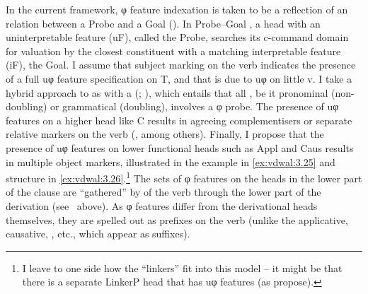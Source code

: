 \documentclass[output=paper]{langsci/langscibook}
\begin{document}
In the current framework, φ feature indexation is taken to be a reflection of
an  relation between a Probe and a Goal (\citealt{Chomsky2000,Chomsky2001}). In
Probe--Goal , a head with an uninterpretable feature (uF), called the
Probe, searches its c-command domain for valuation by the closest constituent
with a matching interpretable feature (iF), the Goal. I assume that subject
marking on the verb indicates the presence of a full uφ feature specification
on T, and that  is due to uφ on little v. I take a hybrid
approach to  as  with a 
(\citealt{Roberts2010,Iorio2014}; ), which
entails that all , be it pronominal (non-doubling) or grammatical
(doubling), involves a φ probe. The presence of uφ features on a higher head
like C results in agreeing complementisers or separate relative markers on the
verb (\citealt{Carstens2003,Henderson2011}, among others). Finally,
I propose that the presence of uφ features on lower functional heads such as
Appl and Caus results in multiple object markers, illustrated in the example in
\eqref{ex:vdwal:3.25} and structure in \eqref{ex:vdwal:3.26}.\footnote{I leave to
    one side how the  \enquote{linkers}
    \parencite{BakerCollins2006,Schneider-Zioga2015} fit into this model -- it
    might be that there is a separate LinkerP head that has uφ features (as
\citealt{BakerCollins2006} propose).} The sets of φ features on the heads in
the lower part of the clause are “gathered” by  of the verb
through the lower part of the derivation (see~ above).  As φ
features differ from the derivational heads themselves, they are spelled out as
prefixes on the verb (unlike the applicative, causative, , etc., which
appear as suffixes).
\end{document}
